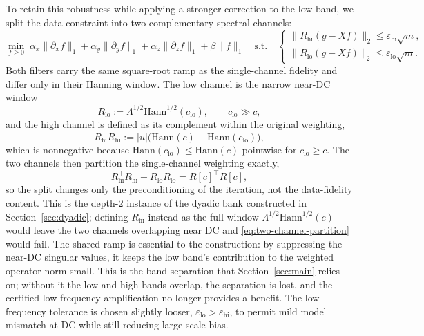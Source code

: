 \documentclass{article}
\begin{document}
To retain this robustness while applying a stronger correction to the low band, we split the data constraint into two complementary spectral channels:
\begin{equation}
\label{eq:two}
\min_{f\ge 0}\;
\alpha_x\|\partial_x f\|_1+\alpha_y\|\partial_y f\|_1+\alpha_z\|\partial_z f\|_1+\beta\|f\|_1
\quad\text{s.t.}\quad
\begin{cases}
\|R_{\mathrm{hi}}(g-Xf)\|_2\le\varepsilon_{\mathrm{hi}}\sqrt{m},\\[0.25em]
\|R_{\mathrm{lo}}(g-Xf)\|_2\le\varepsilon_{\mathrm{lo}}\sqrt{m}.
\end{cases}
\end{equation}
Both filters carry the same square-root ramp as the single-channel fidelity and differ only in their Hanning window. The low channel is the narrow near-DC window
\begin{equation}
\label{eq:Rlo}
R_{\mathrm{lo}}:=\Lambda^{1/2}\mathrm{Hann}^{1/2}(c_{\mathrm{lo}}),
\qquad c_{\mathrm{lo}}\gg c,
\end{equation}
and the high channel is defined as its complement within the original weighting,
\begin{equation}
\label{eq:Rhi}
R_{\mathrm{hi}}^\top R_{\mathrm{hi}}
:=|u|\big(\mathrm{Hann}(c)-\mathrm{Hann}(c_{\mathrm{lo}})\big),
\end{equation}
which is nonnegative because $\mathrm{Hann}(c_{\mathrm{lo}})\le\mathrm{Hann}(c)$ pointwise for $c_{\mathrm{lo}}\ge c$. The two channels then partition the single-channel weighting exactly,
\begin{equation}
\label{eq:two-channel-partition}
R_{\mathrm{hi}}^\top R_{\mathrm{hi}}+R_{\mathrm{lo}}^\top R_{\mathrm{lo}}=R[c]^\top R[c],
\end{equation}
so the split changes only the preconditioning of the iteration, not the data-fidelity content. This is the depth-$2$ instance of the dyadic bank constructed in Section~\ref{sec:dyadic}; defining $R_{\mathrm{hi}}$ instead as the full window $\Lambda^{1/2}\mathrm{Hann}^{1/2}(c)$ would leave the two channels overlapping near DC and \eqref{eq:two-channel-partition} would fail. The shared ramp is essential to the construction: by suppressing the near-DC singular values, it keeps the low band's contribution to the weighted operator norm small. This is the band separation that Section~\ref{sec:main} relies on; without it the low and high bands overlap, the separation is lost, and the certified low-frequency amplification no longer provides a benefit. The low-frequency tolerance is chosen slightly looser, $\varepsilon_{\mathrm{lo}}>\varepsilon_{\mathrm{hi}}$, to permit mild model mismatch at DC while still reducing large-scale bias.
\end{document}
